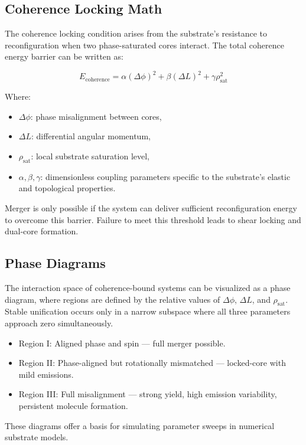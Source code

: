 \documentclass[sn-mathphys]{sn-jnl}
\theoremstyle{thmstyleone}%
\theoremstyle{thmstyletwo}%
\theoremstyle{thmstylethree}%
\begin{document}
\subsection{Coherence Locking Math}

The coherence locking condition arises from the substrate’s resistance to reconfiguration when two phase-saturated cores interact. The total coherence energy barrier can be written as:

$$
E_{\text{coherence}} = \alpha (\Delta \phi)^2 + \beta (\Delta L)^2 + \gamma \rho_{\text{sat}}^2
$$

Where:
\begin{itemize}
\item $\Delta \phi$: phase misalignment between cores,
\item $\Delta L$: differential angular momentum,
\item $\rho_{\text{sat}}$: local substrate saturation level,
\item $\alpha, \beta, \gamma$: dimensionless coupling parameters specific to the substrate’s elastic and topological properties.
\end{itemize}

Merger is only possible if the system can deliver sufficient reconfiguration energy to overcome this barrier. Failure to meet this threshold leads to shear locking and dual-core formation.

\subsection{Phase Diagrams}

The interaction space of coherence-bound systems can be visualized as a phase diagram, where regions are defined by the relative values of $\Delta \phi$, $\Delta L$, and $\rho_{\text{sat}}$. Stable unification occurs only in a narrow subspace where all three parameters approach zero simultaneously.

\begin{itemize}
\item Region I: Aligned phase and spin --- full merger possible.
\item Region II: Phase-aligned but rotationally mismatched --- locked-core with mild emissions.
\item Region III: Full misalignment --- strong yield, high emission variability, persistent molecule formation.
\end{itemize}

These diagrams offer a basis for simulating parameter sweeps in numerical substrate models.
\end{document}
